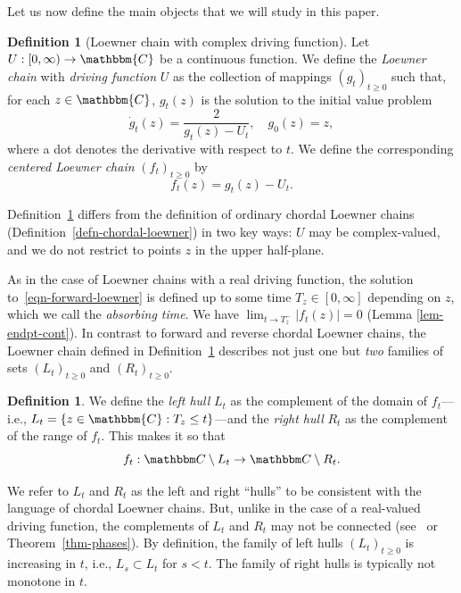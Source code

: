 \documentclass[11pt]{article}
\theoremstyle{plain}
\theoremstyle{definition}
\newtheorem{defn}[thm]{Definition}
\numberwithin{equation}{section}
\newcommand{\eqb}{\begin{equation}}
\newcommand{\eqe}{\end{equation}}
\newcommand{\BB}{\mathbbm}
\newcommand{\rta}{\rightarrow}
\begin{document}
Let us now define the main objects that we will study in this paper. 

 
 
\begin{defn}[Loewner chain with complex driving function]
\label{defn-loewner}
Let $U : [0,\infty) \rta \BB{C}$ be a continuous function.  We define the \emph{Loewner chain} with \emph{driving function} $U$ as the collection of mappings $(g_t)_{t \geq 0}$ such that, for each $z \in \BB{C}$, $g_t(z)$ is the solution to the initial value problem
\eqb
\label{eqn-forward-loewner}
\dot g_t(z) = \frac{2}{g_t(z) - U_t} ,\quad g_0(z) =z ,
\eqe
where a dot denotes the derivative with respect to $t$. 
We define the corresponding \emph{centered Loewner chain} $(f_t)_{t \geq 0}$ by 
\eqb
f_t(z) = g_t(z) - U_t .
\eqe
\end{defn}


Definition~\ref{defn-loewner} differs from the definition of ordinary chordal Loewner chains (Definition~\ref{defn-chordal-loewner}) in two key ways: $U$ may be complex-valued, and we do not restrict to points $z$ in the upper half-plane.

As in the case of Loewner chains with a real driving function, the solution to~\eqref{eqn-forward-loewner} is defined up to some time $T_z \in [0,\infty]$ depending on $z$, which we call the \emph{absorbing time}. We have $\lim_{t\to T_z^-} |f_t(z)| = 0$ (Lemma \ref{lem-endpt-cont}).
In contrast to forward and reverse chordal Loewner chains, the  Loewner chain defined in Definition~\ref{defn-loewner} describes not just one but \emph{two} families of sets $(L_t)_{t \geq 0}$ and $(R_t)_{t \geq 0}$.

\begin{defn} 
We define the \emph{left hull} $L_t$ as the complement of the domain of $f_t$---i.e., $L_t = \{z \in \BB{C} : T_z \leq t\}$---and the \emph{right hull} $R_t$ as the complement of the range of $f_t$.
This makes it so that
\eqb
f_t : \BB C\setminus L_t \rta \BB C\setminus R_t .
\eqe
\end{defn}



 

We refer to $L_t$ and $R_t$ as the left and right ``hulls'' to be consistent with the language of chordal Loewner chains. But, unlike in the case of a real-valued driving function, the complements of $L_t$ and $R_t$ may not be connected (see~\cite{lu-complex-loewner} or Theorem~\ref{thm-phases}).
By definition, the family of left hulls $(L_t)_{t\geq 0}$ is increasing in $t$, i.e., $L_s \subset L_t$ for $s<t$. The family of right hulls is typically not monotone in $t$. 
\end{document}

